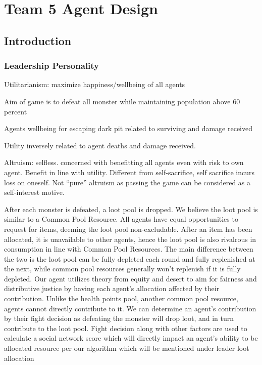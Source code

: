  \useunder{\uline}{\ul}{}
\chapter{Team 5 Agent Design}\label{team_6_agent_design}
\section{Introduction}
\subsection{Leadership Personality}
\noindent Utilitarianism: maximize happiness/wellbeing of all agents

\noindent Aim of game is to defeat all monster while maintaining population above 60 percent


\noindent Agents wellbeing for escaping dark pit related to surviving and damage received


\noindent Utility inversely related to agent deaths and damage received.


\noindent Altruism: selfless. concerned with benefitting all agents even with risk to own agent. Benefit in line with utility. Different from self-sacrifice, self sacrifice incurs loss on oneself. Not “pure” altruism as passing the game can be considered as a self-interest motive.

\medskip

\noindent After each monster is defeated, a loot pool is dropped. We believe the loot pool is similar to a Common Pool Resource. All agents have equal opportunities to request for items, deeming the loot pool non-excludable. After an item has been allocated, it is unavailable to other agents, hence the loot pool is also rivalrous in consumption in line with Common Pool Resources. The main difference between the two is the loot pool can be fully depleted each round and fully replenished at the next, while common pool resources generally won’t replenish if it is fully depleted. Our agent utilizes theory from equity and desert to aim for fairness and distributive justice by having each agent’s allocation affected by their contribution. Unlike the health points pool, another common pool resource, agents cannot directly contribute to it. We can determine an agent’s contribution by their fight decision as defeating the monster will drop loot, and in turn contribute to the loot pool. Fight decision along with other factors are used to calculate a social network score which will directly impact an agent’s ability to be allocated resource per our algorithm which will be mentioned under leader loot allocation

